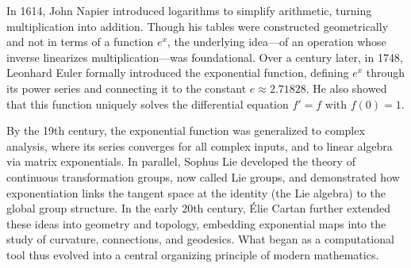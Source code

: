 \begin{historical}
In 1614, John Napier introduced logarithms to simplify arithmetic, turning multiplication into addition. Though his tables were constructed geometrically and not in terms of a function \( e^x \), the underlying idea—of an operation whose inverse linearizes multiplication—was foundational. Over a century later, in 1748, Leonhard Euler formally introduced the exponential function, defining \( e^x \) through its power series and connecting it to the constant \( e \approx 2.71828 \). He also showed that this function uniquely solves the differential equation \( f' = f \) with \( f(0) = 1 \).

By the 19th century, the exponential function was generalized to complex analysis, where its series converges for all complex inputs, and to linear algebra via matrix exponentials. In parallel, Sophus Lie developed the theory of continuous transformation groups, now called Lie groups, and demonstrated how exponentiation links the tangent space at the identity (the Lie algebra) to the global group structure. In the early 20th century, Élie Cartan further extended these ideas into geometry and topology, embedding exponential maps into the study of curvature, connections, and geodesics. What began as a computational tool thus evolved into a central organizing principle of modern mathematics.
\end{historical}
